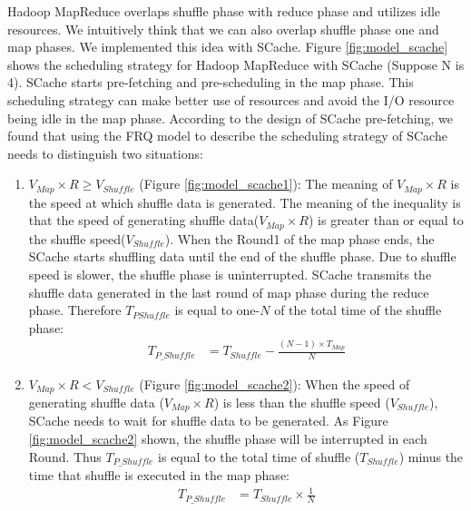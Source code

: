 {Hadoop MapReduce overlaps shuffle phase with reduce phase and utilizes idle resources. We intuitively think that we can also overlap shuffle phase one and map phases. We implemented this idea with SCache.
Figure \ref{fig:model_scache} shows the scheduling strategy for Hadoop MapReduce with SCache (Suppose N is 4). SCache starts pre-fetching and pre-scheduling in the map phase. This scheduling strategy can make better use of resources and avoid the I/O resource being idle in the map phase. According to the design of SCache pre-fetching, we found that using the FRQ model to describe the scheduling strategy of SCache needs to distinguish two situations:

\begin{enumerate}
    \item 
    \(V_{Map} \times R \ge V_{Shuffle}\) (Figure \ref{fig:model_scache1}): 
	The meaning of \(V_{Map} \times R\) is the speed at which shuffle data is generated. The meaning of the inequality is that the speed of generating shuffle data(\(V_{Map} \times R\)) is greater than or equal to the shuffle speed(\(V_{Shuffle}\)). When the Round1 of the map phase ends, the SCache starts shuffling data until the end of the shuffle phase. Due to shuffle speed is slower, the shuffle phase is uninterrupted. SCache transmits the shuffle data generated in the last round of map phase during the reduce phase. Therefore \(T_{PShuffle}\) is equal to one-\(N\) of the total time of the shuffle phase:
	\begin{equation}
		\label{equation_Tpshuffle1}
		\begin{aligned}
			T_{P\_Shuffle} &= T_{Shuffle} - \frac{(N - 1)\times T_{Map}}{N}
		\end{aligned}
	\end{equation}
	
    \item \(V_{Map} \times R < V_{Shuffle}\) (Figure \ref{fig:model_scache2}): 
	When the speed of generating shuffle data (\(V_{Map} \times R\)) is less than the shuffle speed (\(V_{Shuffle}\)), SCache needs to wait for shuffle data to be generated. As Figure \ref{fig:model_scache2} shown, the shuffle phase will be interrupted in each Round. Thus \(T_{P\_Shuffle}\) is equal to the total time of shuffle (\(T_{Shuffle}\)) minus the time that shuffle is executed in the map phase:
	\begin{equation}
		\label{equation_Tpshuffle2}
		\begin{aligned}
			T_{P\_Shuffle} &= T_{Shuffle} \times \frac{1}{N}
		\end{aligned}
	\end{equation}
\end{enumerate}

}
